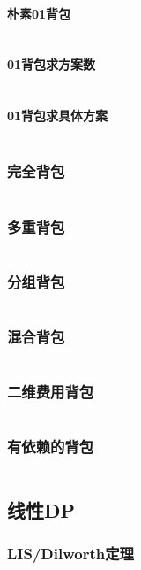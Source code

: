 \documentclass[a4paper,12pt]{article}
\begin{document}
\paragraph{朴素01背包}
\inputminted[breaklines, linenos]{c++}{dp/bag/01.cc}
\paragraph{01背包求方案数}
\inputminted[breaklines, linenos]{c++}{dp/bag/sum.cc}
\paragraph{01背包求具体方案}
\inputminted[breaklines, linenos]{c++}{dp/bag/01_way.cc}
\subsubsection{完全背包}
\inputminted[breaklines, linenos]{c++}{dp/bag/comp.cc}
\subsubsection{多重背包}
\inputminted[breaklines, linenos]{c++}{dp/bag/mul.cc}
\subsubsection{分组背包}
\inputminted[breaklines, linenos]{c++}{dp/bag/group.cc}
\subsubsection{混合背包}
\inputminted[breaklines, linenos]{c++}{dp/bag/mix.cc}
\subsubsection{二维费用背包}
\inputminted[breaklines, linenos]{c++}{dp/bag/2di.cc}
\subsubsection{有依赖的背包}
\inputminted[breaklines, linenos]{c++}{dp/bag/dep.cc}

\subsection{线性DP}
\subsubsection{LIS/Dilworth定理}
\inputminted[breaklines, linenos]{c++}{dp/linear/lis.cc}
\end{document}
